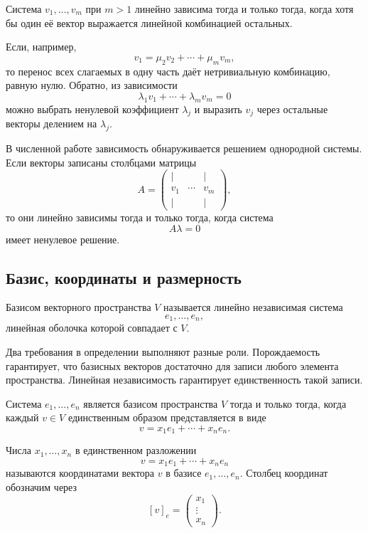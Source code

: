 \begin{proposition}
Система \(v_1,\dots,v_m\) при \(m>1\) линейно зависима тогда и только тогда, когда хотя бы один её вектор выражается линейной комбинацией остальных.
\end{proposition}

\begin{proofidea}
Если, например,
\[
v_1=\mu_2v_2+\cdots+\mu_mv_m,
\]
то перенос всех слагаемых в одну часть даёт нетривиальную комбинацию, равную нулю. Обратно, из зависимости
\[
\lambda_1v_1+\cdots+\lambda_mv_m=0
\]
можно выбрать ненулевой коэффициент \(\lambda_j\) и выразить \(v_j\) через остальные векторы делением на \(\lambda_j\).
\end{proofidea}

В численной работе зависимость обнаруживается решением однородной системы. Если векторы записаны столбцами матрицы
\[
A=
\begin{pmatrix}
| & & | \\
v_1 & \cdots & v_m\\
| & & |
\end{pmatrix},
\]
то они линейно зависимы тогда и только тогда, когда система
\[
A\lambda=0
\]
имеет ненулевое решение.

\subsection{Базис, координаты и размерность}

\begin{definition}
Базисом векторного пространства \(V\) называется линейно независимая система
\[
e_1,\dots,e_n,
\]
линейная оболочка которой совпадает с \(V\).
\end{definition}

Два требования в определении выполняют разные роли. Порождаемость гарантирует, что базисных векторов достаточно для записи любого элемента пространства. Линейная независимость гарантирует единственность такой записи.

\begin{proposition}
Система \(e_1,\dots,e_n\) является базисом пространства \(V\) тогда и только тогда, когда каждый \(v\in V\) единственным образом представляется в виде
\[
v=x_1e_1+\cdots+x_ne_n.
\]
\end{proposition}

\begin{definition}
Числа \(x_1,\dots,x_n\) в единственном разложении
\[
v=x_1e_1+\cdots+x_ne_n
\]
называются координатами вектора \(v\) в базисе \(e_1,\dots,e_n\). Столбец координат обозначим через
\[
[v]_e=
\begin{pmatrix}
x_1\\
\vdots\\
x_n
\end{pmatrix}.
\]
\end{definition}

